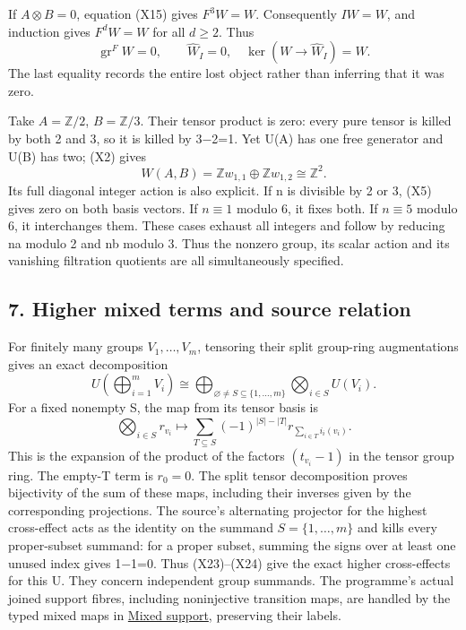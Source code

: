 \documentclass[
]{article}
\newcounter{none} %
\begin{document}
If \(A\otimes B=0\), equation (X15) gives \(F^3W=W\). Consequently
\(IW=W\), and induction gives \(F^dW=W\) for all \(d\ge2\). Thus \[
\operatorname{gr}^F W=0,\qquad\widehat W_I=0,
\quad\ker(W\to\widehat W_I)=W.
\tag{X21}
\] The last equality records the entire lost object rather than
inferring that it was zero.

Take \(A=\mathbb Z/2\), \(B=\mathbb Z/3\). Their tensor product is zero:
every pure tensor is killed by both 2 and 3, so it is killed by 3−2=1.
Yet U(A) has one free generator and U(B) has two; (X2) gives \[
W(A,B)=\mathbb Zw_{1,1}\oplus\mathbb Zw_{1,2}\cong\mathbb Z^2.
\tag{X22}
\] Its full diagonal integer action is also explicit. If n is divisible
by 2 or 3, (X5) gives zero on both basis vectors. If \(n\equiv1\) modulo
6, it fixes both. If \(n\equiv5\) modulo 6, it interchanges them. These
cases exhaust all integers and follow by reducing na modulo 2 and nb
modulo 3. Thus the nonzero group, its scalar action and its vanishing
filtration quotients are all simultaneously specified.

\subsection{7. Higher mixed terms and source
relation}\label{higher-mixed-terms-and-source-relation}

For finitely many groups \(V_1,\ldots,V_m\), tensoring their split
group-ring augmentations gives an exact decomposition \[
U\!\left(\bigoplus_{i=1}^mV_i\right)
\cong\bigoplus_{\varnothing\ne S\subseteq\{1,\ldots,m\}}
\bigotimes_{i\in S}U(V_i).
\tag{X23}
\] For a fixed nonempty S, the map from its tensor basis is \[
\bigotimes_{i\in S}r_{v_i}\longmapsto
\sum_{T\subseteq S}(-1)^{|S|-|T|}
r_{\sum_{i\in T}i_i(v_i)}.
\tag{X24}
\] This is the expansion of the product of the factors \((t_{v_i}-1)\)
in the tensor group ring. The empty-T term is \(r_0=0\). The split
tensor decomposition proves bijectivity of the sum of these maps,
including their inverses given by the corresponding projections. The
source's alternating projector for the highest cross-effect acts as the
identity on the summand \(S=\{1,\ldots,m\}\) and kills every
proper-subset summand: for a proper subset, summing the signs over at
least one unused index gives 1−1=0. Thus (X23)--(X24) give the exact
higher cross-effects for this U. They concern independent group
summands. The programme's actual joined support fibres, including
noninjective transition maps, are handled by the typed mixed maps in
\href{https://github.com/KokunoYumeto/zeta-function-research-reader/blob/6af54ea3c8ef99127af327f3103e086c68d482c2/workbenches/splitzero-tandem/branches/identity-absorber-square/MIXED_SUPPORT.md}{Mixed
support}, preserving their labels.
\end{document}
